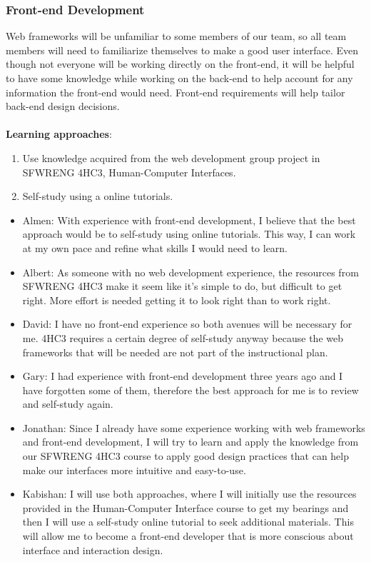 \documentclass[12pt,letterpaper]{article}
\begin{document}
\subsubsection{Front-end Development}
Web frameworks will be unfamiliar to some members of our team, so all team members will need to familiarize themselves to make a good user interface. Even though not everyone will be working directly on the front-end, it will be helpful to have some knowledge while working on the back-end to help account for any information the front-end would need. Front-end requirements will help tailor back-end design decisions. \\
\\
\noindent \textbf{Learning approaches}:
\begin{enumerate}
    \item Use knowledge acquired from the web development group project in SFWRENG 4HC3, Human-Computer Interfaces.
    \item Self-study using a online tutorials.
\end{enumerate}

\begin{itemize}
    \item Almen: With experience with front-end development, I believe that the best approach would be to self-study using online tutorials. This way, I can work at my own pace and refine what skills I would need to learn.
    \item Albert: As someone with no web development experience, the resources from SFWRENG 4HC3 make it seem like it's simple to do, but difficult to get right. More effort is needed getting it to look right than to work right. 
    \item David: I have no front-end experience so both avenues will be necessary for me. 4HC3 requires a certain degree of self-study anyway because the web frameworks that will be needed are not part of the instructional plan.
    \item Gary: I had experience with front-end development three years ago and I have forgotten some of them, therefore the best approach for me is to review and self-study again.
    \item Jonathan: Since I already have some experience working with web frameworks and front-end development, I will try to learn and apply the knowledge from our SFWRENG 4HC3 course to apply good design practices that can help make our interfaces more intuitive and easy-to-use.
    \item Kabishan: I will use both approaches, where I will initially use the resources provided in the Human-Computer Interface course to get my bearings and then I will use a self-study online tutorial to seek additional materials. This will allow me to become a front-end developer that is more conscious about interface and interaction design.
\end{itemize}
\end{document}
